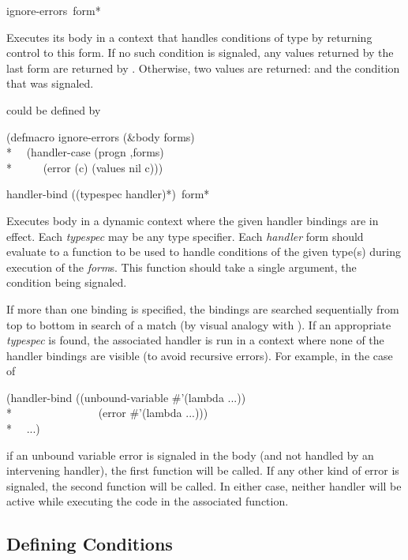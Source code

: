\begin{defmac}
ignore-errors {\,form}*

  Executes its body in a context that handles conditions of type  by
  returning control to this form. If no such condition is signaled, any
  values returned by the last form are returned by . Otherwise,
  two values are returned:  and the  condition that was signaled.

 could be defined by
\begin{lisp}
(defmacro ignore-errors (\&body forms) \\*
~~{\Xbq}(handler-case (progn ,{\Xatsign}forms) \\*
~~~~~(error (c) (values nil c)))
\end{lisp}
\end{defmac}


\begin{defmac}
handler-bind ({(typespec handler)}*) {\,form}*

  Executes body in a dynamic context where the given handler bindings 
  are in effect.
  Each \emph{typespec} may be any type specifier.
  Each \emph{handler} form should evaluate to a function to be used to handle conditions 
  of the given type(s) during execution of the \emph{form\/}s. This function should
  take a single argument, the condition being signaled.

  If more than one binding is specified, the bindings are searched 
  sequentially from top to bottom in search of a match (by visual analogy
  with ). If an appropriate \emph{typespec} is found, the associated handler 
  is run in a context where none of the handler bindings are visible (to avoid
  recursive errors). For example, in the case of
\begin{lisp}
(handler-bind ((unbound-variable \#'(lambda ...)) \\*
~~~~~~~~~~~~~~~(error \#'(lambda ...))) \\*
~~...)
\end{lisp}
  if an unbound variable error is signaled in the body (and not handled
  by an intervening handler), the first function will be called. If any
  other kind of error is signaled, the second function will be called.
  In either case, neither handler will be active while executing the code
  in the associated function.
\end{defmac}


\subsection{Defining Conditions}


